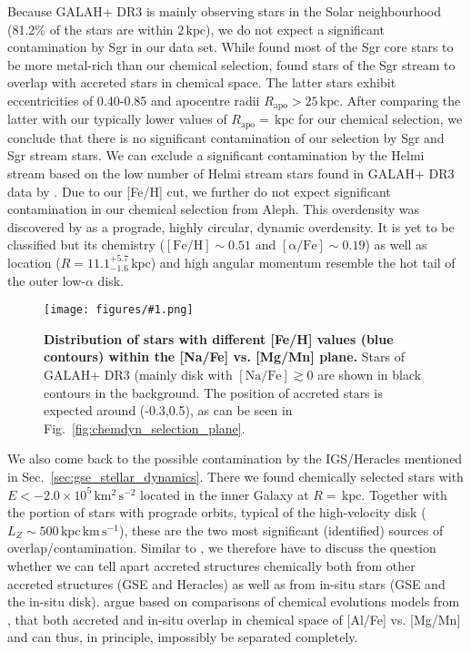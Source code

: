\documentclass[fleqn,usenatbib]{mnras}
\newcommand{\kpc}{\,\mathrm{kpc}}	%
\newcommand{\kpckms}{\,\mathrm{kpc\,km\,s^{-1}}}	%
\newcommand{\kmkmss}{\,\mathrm{km^2\,s^{-2}}}	%
\newcommand{\codeicon}{{\faCloudDownload}}
\newcommand{\codelink}[1]{\href{https://github.com/svenbuder/Accreted-stars-in-GALAH-DR3/tree/main/figures/#1.ipynb}{\codeicon}\,\,}
\newcommand{\oscaption}[2]{\caption{#2 \codelink{#1}}}
\newcommand{\figurecolumnwidth}[3]{\begin{figure} \centering \texttt{[image: figures/\#1.png]}\oscaption{#2}{#3}\label{fig:#1} \end{figure}}
\begin{document}
Because GALAH+ DR3 is mainly observing stars in the Solar neighbourhood (81.2\% of the stars are within $2\kpc$), we do not expect a significant contamination by Sgr in our data set. While \citet{Hasselquist2017} found most of the Sgr core stars to be more metal-rich than our chemical selection, \citet{Hasselquist2019} found stars of the Sgr stream to overlap with accreted stars in chemical space. The latter stars exhibit eccentricities of 0.40-0.85 and apocentre radii $R_\text{apo} > 25\kpc$. After comparing the latter with our typically lower values of $R_\text{apo} = $$\kpc$ for our chemical selection, we conclude that there is no significant contamination of our selection by Sgr and Sgr stream stars. We can exclude a significant contamination by the Helmi stream based on the low number of Helmi stream stars found in GALAH+ DR3 data by \citet{Limberg2021}. Due to our [Fe/H] cut, we further do not expect significant contamination in our chemical selection from Aleph. This overdensity was discovered by \citet{Naidu2020} as a prograde, highly circular, dynamic overdensity. It is yet to be classified but its chemistry ($\mathrm{[Fe/H]} \sim 0.51$ and $\mathrm{[\alpha/Fe]} \sim 0.19$) as well as location ($R = 11.1_{-1.6}^{+5.7}\kpc$) and high angular momentum resemble the hot tail of the outer low-$\alpha$ disk.

\figurecolumnwidth{NaFe_MgMn_FeH_bins}{chronochemodynamic_comparison}{
\textbf{Distribution of stars with different [Fe/H] values (blue contours) within the [Na/Fe] vs. [Mg/Mn] plane.} Stars of GALAH+ DR3 (mainly disk with $\mathrm{[Na/Fe]} \gtrsim 0$ are shown in black contours in the background. The position of accreted stars is expected around (-0.3,0.5), as can be seen in Fig.~\ref{fig:chemdyn_selection_plane}.
}

We also come back to the possible contamination by the IGS/Heracles \citep{Horta2021} mentioned in Sec.~\ref{sec:gse_stellar_dynamics}. There we found  chemically selected stars with $E < -2.0 \times 10^5 \kmkmss$ located in the inner Galaxy at $R = $$ \kpc$. Together with the portion of  stars with prograde orbits, typical of the high-velocity disk ($L_Z \sim 500\kpckms$), these are the two most significant (identified) sources of overlap/contamination. Similar to \citet{Horta2021}, we therefore have to discuss the question whether we can tell apart accreted structures chemically both from other accreted structures (GSE and Heracles) as well as from in-situ stars (GSE and the in-situ disk). \citet{Horta2021} argue based on comparisons of chemical evolutions models from \citet{Andrews2017}, that both accreted and in-situ overlap in chemical space of [Al/Fe] vs. [Mg/Mn] and can thus, in principle, impossibly be separated completely.
\end{document}
